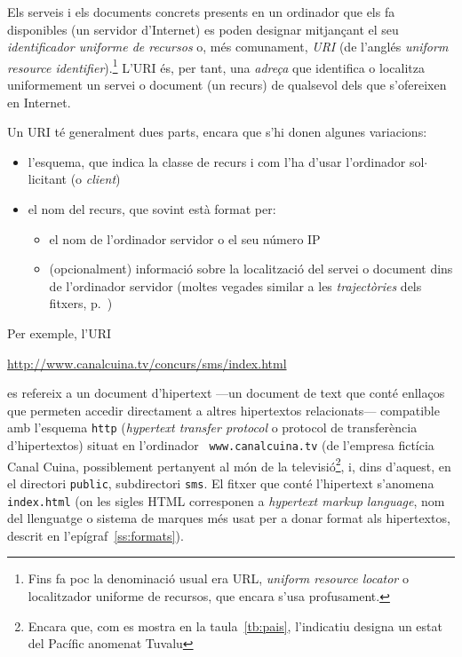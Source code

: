 Els serveis i els documents concrets presents en un ordinador que els
fa disponibles (un servidor d'Internet) es poden designar
mitjançant el seu \emph{identificador uniforme de recursos} o,
més comunament, \emph{URI} (de l'anglés \emph{uniform resource
  identifier}).\footnote{Fins fa poc la denominació usual era URL,
  \emph{uniform resource locator} o localitzador uniforme de recursos,
  que encara s'usa profusament.} L'URI és, per tant, una
\emph{adreça} que identifica o localitza uniformement un servei o
document (un recurs) de qualsevol dels que s'ofereixen en Internet.

Un URI té generalment dues parts, encara que s'hi donen algunes
variacions:
\begin{itemize}
\item l'esquema, que indica la classe de recurs i com l'ha d'usar
      l'ordinador sol$\cdot$licitant (o \emph{client})
\item el nom del recurs, que sovint està format per:
  \begin{itemize}
  \item el nom de l'ordinador servidor o el seu número IP
  \item (opcionalment) informació sobre la localització del
    servei o document dins de l'ordinador servidor (moltes vegades
    similar a les \emph{trajectòries} dels fitxers, p.~\pageref{pg:fitxer})
  \end{itemize}
\end{itemize}
Per exemple, l'URI
\begin{center}
\url{http://www.canalcuina.tv/concurs/sms/index.html}
\end{center}
es refereix a un document d'hipertext ---un
  document de text que conté enllaços que permeten accedir
  directament a altres hipertextos relacionats--- compatible amb 
l'esquema {\tt http} (\emph{hypertext transfer protocol} o protocol de
transferència d'hipertextos) situat en l'ordinador {\tt
  www.canalcuina.tv} (de l'empresa fictícia Canal Cuina,
  possiblement pertanyent al món de la televisió\footnote{Encara que,
  com es mostra en la taula~\ref{tb:pais}, l'indicatiu designa un estat
  del Pacífic anomenat Tuvalu}, i, dins d'aquest, 
  en el directori {\tt public},
subdirectori {\tt sms}. El fitxer que conté l'hipertext s'anomena
{\tt index.html} (on les sigles HTML corresponen a \emph{hypertext
  markup language}, nom del llenguatge o sistema de marques més usat
per a donar format als hipertextos, descrit en
l'epígraf~\ref{ss:formats}).


